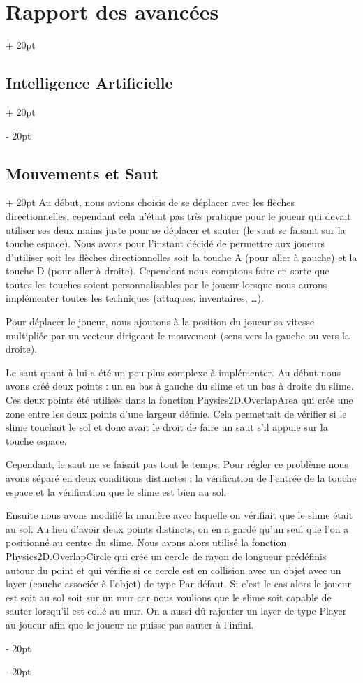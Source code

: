\documentclass[a4paper, 12pt, twoside]{article}
\newcommand{\ind}[1][20pt]{\advance\leftskip + #1}
\newcommand{\deind}[1][20pt]{\advance\leftskip - #1}
\newenvironment{indt}[2][20pt]{#2 \par \ind[#1]}{\par \deind} %
\begin{document}
\begin{indt}{\section{Rapport des avancées}}
\begin{indt}{\subsection{Intelligence Artificielle}}
        \end{indt}

        \begin{indt}{\subsection{Mouvements et Saut}}
            Au début, nous avions choisis de se déplacer avec les flèches directionnelles, cependant cela n'était pas très pratique pour le joueur qui devait utiliser ses deux mains juste pour se déplacer et sauter (le saut se faisant sur la touche espace). Nous avons pour l'instant décidé de permettre aux joueurs d'utiliser soit les flèches directionnelles soit la touche A (pour aller à gauche) et la touche D (pour aller à droite). Cependant nous comptons faire en sorte que toutes les touches soient personnalisables par le joueur lorsque nous aurons implémenter toutes les techniques (attaques, inventaires, …).

            Pour déplacer le joueur, nous ajoutons à la position du joueur sa vitesse multipliée par un vecteur dirigeant le mouvement (sens vers la gauche ou vers la droite).

            Le saut quant à lui a été un peu plus complexe à implémenter. Au début nous avons créé deux points : un en bas à gauche du slime et un bas à droite du slime. Ces deux points été utilisés dans la fonction Physics2D.OverlapArea qui crée une zone entre les deux points d'une largeur définie. Cela permettait de vérifier si le slime touchait le sol et donc avait le droit de faire un saut s'il appuie sur la touche espace. 

            Cependant, le saut ne se faisait pas tout le temps. Pour régler ce problème nous avons séparé en deux conditions distinctes : la vérification de l'entrée de la touche espace et la vérification que le slime est bien au sol. 

            Ensuite nous avons modifié la manière avec laquelle on vérifiait que le slime était au sol. Au lieu d'avoir deux points distincts, on en a gardé qu'un seul que l'on a positionné au centre du slime. Nous avons alors utilisé la fonction Physics2D.OverlapCircle qui crée un cercle de rayon de longueur prédéfinis autour du point et qui vérifie si ce cercle est en collision avec un objet avec un layer (couche associée à l'objet) de type Par défaut. Si c'est le cas alors le joueur est soit au sol soit sur un mur car nous voulions que le slime soit capable de sauter lorsqu'il est collé au mur. On a aussi dû rajouter un layer de type Player au joueur afin que le joueur ne puisse pas sauter à l'infini. 


\end{indt}
\end{indt}
\end{document}
